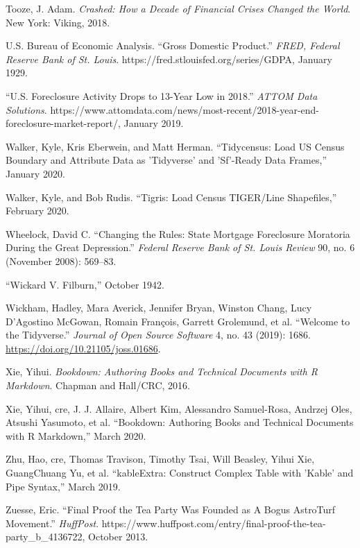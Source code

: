 \documentclass[12pt,oneside]{psthesis}
\begin{document}
\leavevmode\hypertarget{ref-toozeCrashedHowDecade2018}{}%
Tooze, J. Adam. \emph{Crashed: How a Decade of Financial Crises Changed the World}. New York: Viking, 2018.

\leavevmode\hypertarget{ref-usbureauofeconomicanalysis1929gross}{}%
U.S. Bureau of Economic Analysis. ``Gross Domestic Product.'' \emph{FRED, Federal Reserve Bank of St. Louis}. https://fred.stlouisfed.org/series/GDPA, January 1929.

\leavevmode\hypertarget{ref-2019foreclosure}{}%
``U.S. Foreclosure Activity Drops to 13-Year Low in 2018.'' \emph{ATTOM Data Solutions}. https://www.attomdata.com/news/most-recent/2018-year-end-foreclosure-market-report/, January 2019.

\leavevmode\hypertarget{ref-walker2020tidycensus}{}%
Walker, Kyle, Kris Eberwein, and Matt Herman. ``Tidycensus: Load US Census Boundary and Attribute Data as 'Tidyverse' and 'Sf'-Ready Data Frames,'' January 2020.

\leavevmode\hypertarget{ref-walker2020tigris}{}%
Walker, Kyle, and Bob Rudis. ``Tigris: Load Census TIGER/Line Shapefiles,'' February 2020.

\leavevmode\hypertarget{ref-wheelock2008changing}{}%
Wheelock, David C. ``Changing the Rules: State Mortgage Foreclosure Moratoria During the Great Depression.'' \emph{Federal Reserve Bank of St. Louis Review} 90, no. 6 (November 2008): 569--83.

\leavevmode\hypertarget{ref-1942wickard}{}%
``Wickard V. Filburn,'' October 1942.

\leavevmode\hypertarget{ref-wickham2019welcome}{}%
Wickham, Hadley, Mara Averick, Jennifer Bryan, Winston Chang, Lucy D'Agostino McGowan, Romain François, Garrett Grolemund, et al. ``Welcome to the Tidyverse.'' \emph{Journal of Open Source Software} 4, no. 43 (2019): 1686. \url{https://doi.org/10.21105/joss.01686}.

\leavevmode\hypertarget{ref-xie2016bookdown}{}%
Xie, Yihui. \emph{Bookdown: Authoring Books and Technical Documents with R Markdown}. Chapman and Hall/CRC, 2016.

\leavevmode\hypertarget{ref-xie2020bookdown}{}%
Xie, Yihui, cre, J. J. Allaire, Albert Kim, Alessandro Samuel-Rosa, Andrzej Oles, Atsushi Yasumoto, et al. ``Bookdown: Authoring Books and Technical Documents with R Markdown,'' March 2020.

\leavevmode\hypertarget{ref-zhu2019kableextra}{}%
Zhu, Hao, cre, Thomas Travison, Timothy Tsai, Will Beasley, Yihui Xie, GuangChuang Yu, et al. ``kableExtra: Construct Complex Table with 'Kable' and Pipe Syntax,'' March 2019.

\leavevmode\hypertarget{ref-zuesse2013final}{}%
Zuesse, Eric. ``Final Proof the Tea Party Was Founded as A Bogus AstroTurf Movement.'' \emph{HuffPost}. https://www.huffpost.com/entry/final-proof-the-tea-party\_b\_4136722, October 2013.


\end{document}
